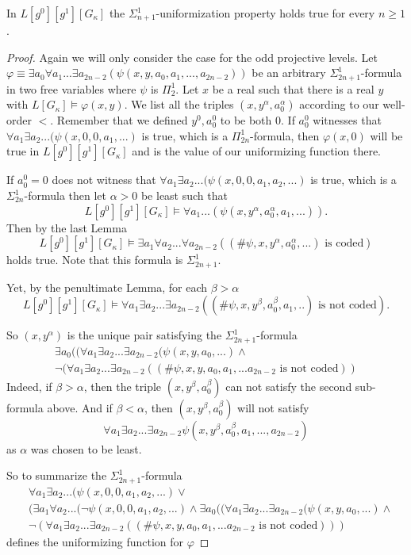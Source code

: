 \documentclass[10pt,a4paper]{amsart}
\begin{document}
\begin{lemma}
In $L[g^0][g^1][G_{\kappa}]$ the $\Sigma^1_{n+1}$-uniformization property holds true for every $n \ge 1$.
\end{lemma}

\begin{proof}
Again we will only consider the case for the odd projective levels. Let $\varphi \equiv \exists a_0 \forall a_1 ...\exists a_{2n-2} (\psi (x,y,a_0,a_1,...,a_{2n-2}))$ be an arbitrary $\Sigma^1_{2n+1}$-formula in two free variables where $\psi$ is $\Pi^1_2$.
Let $x$ be a real such that there is a real $y $ with $L[G_{\kappa}] \models \varphi(x,y)$. We list all the triples $(x,y^{\alpha} ,a_0^{\alpha})$ according to our well-order $<$.
Remember that we defined $y^0, a_0^0$ to be both $0$. If $a_0^0$ witnesses that $\forall a_1 \exists a_2... (\psi (x,0,0,a_1,...)$ is true, which is a $\Pi^1_{2n}$-formula, then $\varphi (x,0)$ will be true in $L[g^0][g^1][G_{\kappa}]$ and is the value of our uniformizing function there.

If $a^0_0=0$ does not witness that $\forall a_1 \exists a_2...(\psi(x,0,0,a_1,a_2,...)$ is true, which is a $\Sigma^1_{2n}$-formula then 
let $\alpha> 0$ be least such that
\[ L[g^0][g^1][G_{\kappa}] \models \forall a_1... (\psi (x,y^{\alpha},a_0^{\alpha},a_1,...) ).\]
Then by the last Lemma
\[ L[g^0][g^1][G_{\kappa}] \models \exists a_1 \forall a_2... \forall a_{2n-2} ( (\# \psi,x,y^{\alpha},a^{\alpha}_0,...) \text{ is coded} ) \]
holds true. Note that this formula is $\Sigma^1_{2n+1}$.


Yet, by the penultimate Lemma, for each $\beta > \alpha$
\[ L[g^0][g^1][G_{\kappa}] \models\forall a_1 \exists a_2... \exists a_{2n-2} ((\#\psi,x,y^{\beta},a^{\beta}_0,a_1,..) \text{ is not coded}). \]

So $(x,y^{\alpha})$ is the unique pair satisfying the $\Sigma^1_{2n+1}$-formula
\begin{align*}
\exists a_0 ( (\forall a_1 \exists a_2...\exists a_{2n-2} ( \psi (x,y,a_0,...) \land \\
\lnot (\forall a_1 \exists a_2 ...\exists a_{2n-2} ((\#\psi,x,y,a_0,a_1,...a_{2n-2} \text{ is not coded} ) )
\end{align*}
Indeed, if $\beta > \alpha$, then the triple $(x,y^{\beta}, a_0^{\beta})$ can not satisfy the second sub-formula above. And if $\beta < \alpha$, then $(x,y^{\beta}, a_0^{\beta} )$ 
will not satisfy \[\forall a_1 \exists a_2...\exists a_{2n-2} \psi( x,y^{\beta}, a_0^{\beta}, a_1,...,a_{2n-2} )\] as $\alpha$ was chosen to be least.

So to summarize the $\Sigma^1_{2n+1}$-formula 
\begin{align*}
&\forall a_1 \exists a_2... (\psi (x,0,0,a_1,a_2,...) \lor \\&
(\exists a_1 \forall a_2...(\lnot \psi (x,0,0,a_1,a_2,...) \land
\exists a_0 ( (\forall a_1 \exists a_2...\exists a_{2n-2} ( \psi (x,y,a_0,...) \land \\&
\lnot (\forall a_1 \exists a_2 ...\exists a_{2n-2} ((\#\psi,x,y,a_0,a_1,...a_{2n-2} \text{ is not coded} ) ) )
\end{align*}
defines the uniformizing function for $\varphi$
\end{proof}
\end{document}
